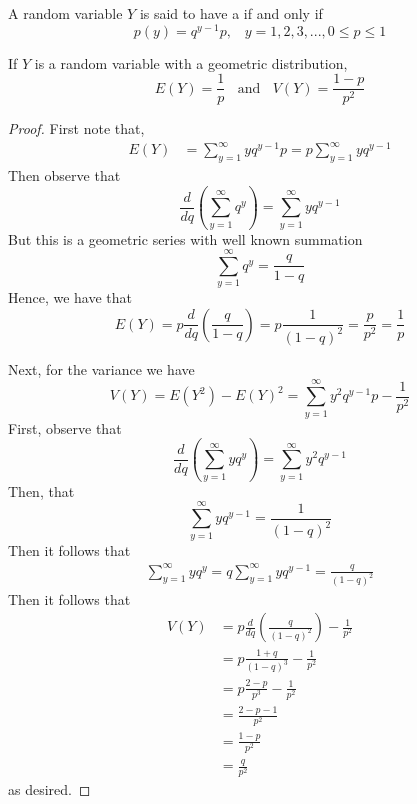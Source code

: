 \documentclass[12pt, a4paper, twoside, openright, titlepage]{book}
\begin{document}
\begin{defn}{}{}
    A random variable $Y$ is said to have a  if and only if \begin{equation*}
        p(y) = q^{y-1}p,\;\;\;y = 1,2,3,..., 0\leq p \leq 1
    \end{equation*}
\end{defn}


\begin{thm}{}{}
    If $Y$ is a random variable with a geometric distribution, \begin{equation*}
        E(Y) = \frac{1}{p}\;\;\text{ and }\;\;V(Y) = \frac{1-p}{p^2}
    \end{equation*}
\end{thm}
\begin{proof}
    First note that,
    \begin{align*}
        E(Y) &= \sum\limits_{y=1}^{\infty}yq^{y-1}p = p\sum\limits_{y=1}^{\infty}yq^{y-1}
    \end{align*}
    Then observe that $$\frac{d}{dq} \left(\sum\limits_{y=1}^{\infty}q^y\right) = \sum\limits_{y=1}^{\infty}yq^{y-1}$$
    But this is a geometric series with well known summation \begin{equation*}
        \sum\limits_{y=1}^{\infty}q^y = \frac{q}{1-q}
    \end{equation*}
    Hence, we have that \begin{equation*}
        E(Y) = p\frac{d}{dq}\left(\frac{q}{1-q}\right) = p\frac{1}{(1-q)^2} = \frac{p}{p^2} = \frac{1}{p}
    \end{equation*}
    

    Next, for the variance we have \begin{equation*}
        V(Y) = E(Y^2)-E(Y)^2 = \sum\limits_{y=1}^{\infty}y^2q^{y-1}p - \frac{1}{p^2}
    \end{equation*}
    First, observe that $$\frac{d}{dq} \left(\sum\limits_{y=1}^{\infty}yq^y\right) = \sum\limits_{y=1}^{\infty}y^2q^{y-1}$$
    Then, that \begin{equation*}
        \sum\limits_{y=1}^{\infty}yq^{y-1} = \frac{1}{(1-q)^2}
    \end{equation*}
    Then it follows that \begin{align*}
        \sum\limits_{y=1}^{\infty}yq^y = q\sum\limits_{y=1}^{\infty}yq^{y-1} = \frac{q}{(1-q)^2}
    \end{align*}
    Then it follows that \begin{align*}
        V(Y) &= p\frac{d}{dq}\left(\frac{q}{(1-q)^2}\right) -\frac{1}{p^2} \\
        &= p\frac{1+q}{(1-q)^3} - \frac{1}{p^2} \\
        &= p\frac{2-p}{p^3} - \frac{1}{p^2} \\
        &= \frac{2-p-1}{p^2} \\
        &=\frac{1-p}{p^2} \\
        &= \frac{q}{p^2}
    \end{align*}
    as desired.
\end{proof}
\end{document}
